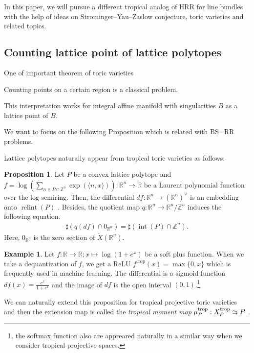 \documentclass[a4paper,dvipdfmx,reqno,12pt]{amsart}
\theoremstyle{definition}
\newtheorem{Eg}[Thm]{Example}
\newtheorem{Prop}[Thm]{Proposition}
\newcommand{\R}{\mathbb{R}}%
\newcommand{\Z}{\mathbb{Z}}%
\newcommand{\opn}[1]{\operatorname{#1}}
\newcommand{\abk}[1]{\langle {#1} \rangle}%
\newcommand{\simto}{ 
\mathrel{\raisebox{0.13em}{${\sim}$}}
\kern -0.75em \mathrel{\raisebox{-0.11em}{${\scriptstyle \to}$}}  
}
\numberwithin{equation}{section}
\begin{document}
In this paper, we will pursue a different tropical
analog of HRR for line bundles with the help of ideas on 
Strominger--Yau--Zaslow conjecture,
toric varieties and related topics.

\subsection{Counting lattice point of lattice polytopes}

One of important theorem of toric varieties

Counting points on a certain region is a classical problem.

 


  

This interpretation works for integral affine manifold 
with singularities $B$ as a lattice point of $B$. 

We want to focus on the following Proposition which is related with
BS=RR problems.

Lattice polytopes naturally appear from tropical toric
varieties as follows: 

\begin{Prop}
Let $P$ be a convex lattice polytope and
$f=\log (\sum_{n\in P\cap \Z^{n}} \opn{exp}(\abk{n,x}))\colon \R^{n}\to \R$ be 
a Laurent polynomial function over the log semiring. Then,
 the differential
$df:\R^{n}\to (\R^{n})^{\vee}$ is an embedding onto $\opn{relint}(P)$
\cite[p.124 Exercise]{MR1301331}.
Besides, the quotient map $q: \R^{n}\to \R^{n}/\Z^{n}$ induces the following
equation.
\begin{align}
\sharp (q(df)\cap 0_{\R^{n}})=\sharp (\opn{int}(P)\cap \Z^{n}). 
\end{align}
Here, $0_{{\R}^{n}}$ is the zero section of $\check{X}(\R^{n})$.
\end{Prop}

\begin{Eg}
Let $f:\R \to \R; x\mapsto \log (1+e^{x})$ be a soft 
plus function. When we take a dequantization of $f$,
we get a ReLU $f^{\opn{trop}}(x)=\max\{0,x\}$ which 
is frequently used in machine learning.
The differential is a sigmoid function 
$df(x)=\frac{e^{x}}{1+e^{x}}$ and 
the image of $df$ is the open interval $(0,1)$.\footnote{
the softmax function also are appreared 
naturally in a similar way 
when we consider tropical projective spaces.}
\end{Eg}

We can naturally extend this proposition for tropical projective toric 
varieties and then the extension map is called the \emph{tropical moment map}
$\mu_{P}^{\opn{trop}}: X_{P}^{\opn{trop}}\simto P$ 
\cite[Definition 2.1 (2)]{MR2428356}.
\end{document}
